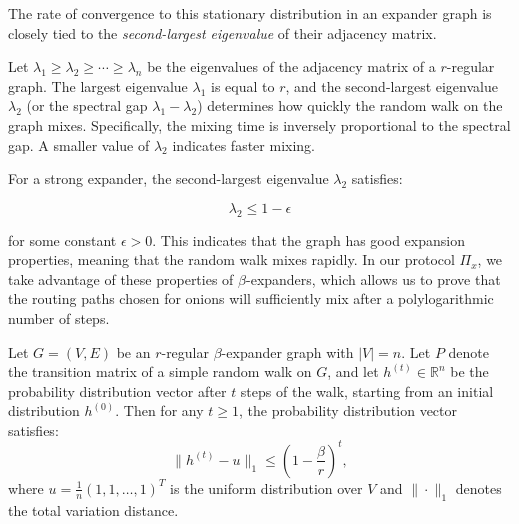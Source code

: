 The rate of convergence to this stationary distribution in an expander graph is closely tied to the \textit{second-largest eigenvalue} of their adjacency matrix. 

\begin{definition}  \label{def:second-largest-eig}
    Let $\lambda_1 \geq \lambda_2 \geq \cdots \geq \lambda_n$ be the eigenvalues of the adjacency matrix of a $r$-regular graph. The largest eigenvalue $\lambda_1$ is equal to $r$, and the second-largest eigenvalue $\lambda_2$ (or the spectral gap $\lambda_1 - \lambda_2$) determines how quickly the random walk on the graph mixes. Specifically, the mixing time is inversely proportional to the spectral gap. A smaller value of $\lambda_2$ indicates faster mixing.

For a strong expander, the second-largest eigenvalue $\lambda_2$ satisfies:

$$
\lambda_2 \leq 1 - \epsilon
$$

for some constant $\epsilon > 0$. This indicates that the graph has good expansion properties, meaning that the random walk mixes rapidly. In our protocol $\Pi_x$, we take advantage of these properties of $\beta$-expanders, which allows us to prove that the routing paths chosen for onions will sufficiently mix after a polylogarithmic number of steps.
\end{definition}

\begin{definition} \label{def:bound-prob-distribution}
Let $G = (V, E)$ be an $r$-regular $\beta$-expander graph with $|V| = n$. Let $P$ denote the transition matrix of a simple random walk on $G$, and let $h^{(t)} \in \mathbb{R}^n$ be the probability distribution vector after $t$ steps of the walk, starting from an initial distribution $h^{(0)}$. Then for any $t \geq 1$, the probability distribution vector satisfies:
$$
\| h^{(t)} - u \|_1 \leq \left(1 - \frac{\beta}{r}\right)^t,
$$
where $u = \frac{1}{n}(1, 1, \dots, 1)^T$ is the uniform distribution over $V$ and $\|\cdot\|_1$ denotes the total variation distance.
\end{definition}




